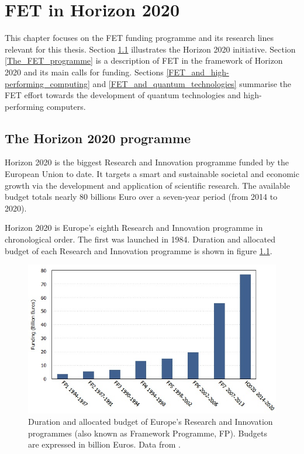 \chapter{FET in Horizon 2020}
This chapter focuses on the FET funding programme and its research lines relevant for this thesis. Section \ref{The_Horizon_2020_programme} illustrates the Horizon 2020 initiative. Section \ref{The_FET_programme} is a description of FET in the framework of Horizon 2020 and its main calls for funding. Sections \ref{FET_and_high-performing_computing} and \ref{FET_and_quantum_technologies} summarise the FET effort towards the development of quantum technologies and high-performing computers.

\section{The Horizon 2020 programme} \label{The_Horizon_2020_programme}
Horizon 2020 is the biggest Research and Innovation programme funded by the European Union to date. It targets a smart and sustainable societal and economic growth via the development and application of scientific research. The available budget totals nearly 80 billions Euro over a seven-year period (from 2014 to 2020).

Horizon 2020 is Europe's eighth Research and Innovation programme in chronological order. The first was launched in 1984. Duration and allocated budget of each Research and Innovation programme is shown in figure \ref{FP_funds}.

\begin{figure}[!t] 
 \begin{center}
 \includegraphics[scale=0.4]{Images/FP_funds.jpg}
 \caption{Duration and allocated budget of Europe's Research and Innovation programmes (also known as Framework Programme, FP). Budgets are expressed in billion Euros. Data from \cite{OECD}.}
 \label{FP_funds}
 \end{center}
\end{figure}

